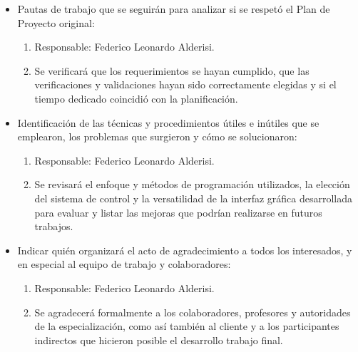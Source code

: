 \documentclass[
11pt, %
]{charter}
\begin{document}
\begin{itemize}
	\item Pautas de trabajo que se seguirán para analizar si se respetó el Plan de Proyecto original:
		\begin{enumerate}
		\item Responsable: Federico Leonardo Alderisi.
		\item Se verificará que los requerimientos se hayan cumplido, que las verificaciones y validaciones hayan sido correctamente elegidas y si el tiempo dedicado coincidió con la planificación.
		\end{enumerate}		 
	\item Identificación de las técnicas y procedimientos útiles e inútiles que se emplearon, los problemas que surgieron y cómo se solucionaron:
		\begin{enumerate}
		\item Responsable: Federico Leonardo Alderisi.
		\item Se revisará el enfoque y métodos de programación utilizados, la elección del sistema de control y la versatilidad de la interfaz gráfica desarrollada para evaluar y listar las mejoras que podrían realizarse en futuros trabajos.
		\end{enumerate}	
	\item Indicar quién organizará el acto de agradecimiento a todos los interesados, y en especial al equipo de trabajo y colaboradores:
		\begin{enumerate}
		\item Responsable: Federico Leonardo Alderisi.
		\item Se agradecerá formalmente a los colaboradores, profesores y autoridades de la especialización, como así también al cliente y a los participantes indirectos que hicieron posible el desarrollo trabajo final.
		\end{enumerate}	
\end{itemize}	  
	  
\end{document}
